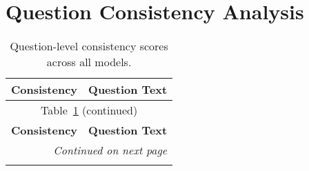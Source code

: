 \section{Question Consistency Analysis}
\label{sec:question_consistency_analysis}

\begin{longtable}{p{}p{}}
    \caption{Question-level consistency scores across all models.\label{tab:question_consistency}}\\
    \hline
    \textbf{Consistency} & \textbf{Question Text} \\
    \hline
    \endfirsthead
    
    \hline
    \multicolumn{2}{c}{Table~\ref{tab:question_consistency} (continued)} \\
    \hline
    \textbf{Consistency} & \textbf{Question Text} \\
    \hline
    \endhead
    
    \hline
    \multicolumn{2}{r}{\textit{Continued on next page}} \\
    \endfoot
    

\end{longtable}
